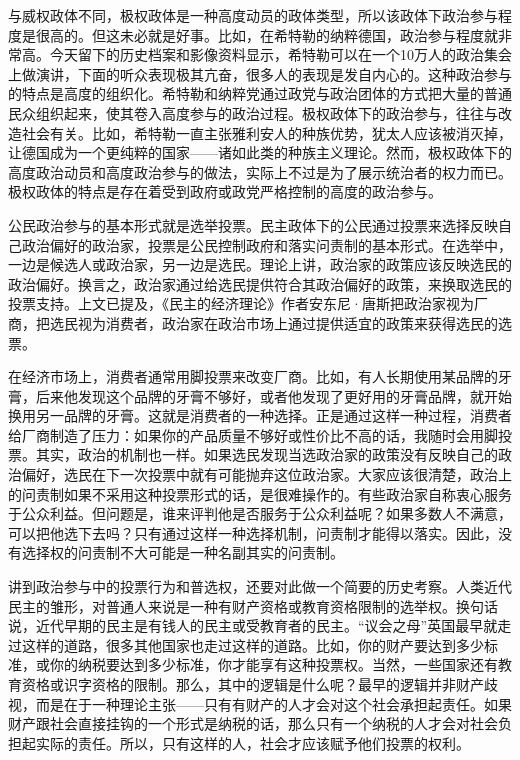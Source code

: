 与威权政体不同，极权政体是一种高度动员的政体类型，所以该政体下政治参与程度是很高的。但这未必就是好事。比如，在希特勒的纳粹德国，政治参与程度就非常高。今天留下的历史档案和影像资料显示，希特勒可以在一个10万人的政治集会上做演讲，下面的听众表现极其亢奋，很多人的表现是发自内心的。这种政治参与的特点是高度的组织化。希特勒和纳粹党通过政党与政治团体的方式把大量的普通民众组织起来，使其卷入高度参与的政治过程。极权政体下的政治参与，往往与改造社会有关。比如，希特勒一直主张雅利安人的种族优势，犹太人应该被消灭掉，让德国成为一个更纯粹的国家——诸如此类的种族主义理论。然而，极权政体下的高度政治动员和高度政治参与的做法，实际上不过是为了展示统治者的权力而已。极权政体的特点是存在着受到政府或政党严格控制的高度的政治参与。


公民政治参与的基本形式就是选举投票。民主政体下的公民通过投票来选择反映自己政治偏好的政治家，投票是公民控制政府和落实问责制的基本形式。在选举中，一边是候选人或政治家，另一边是选民。理论上讲，政治家的政策应该反映选民的政治偏好。换言之，政治家通过给选民提供符合其政治偏好的政策，来换取选民的投票支持。上文已提及，《民主的经济理论》作者安东尼·唐斯把政治家视为厂商，把选民视为消费者，政治家在政治市场上通过提供适宜的政策来获得选民的选票。

在经济市场上，消费者通常用脚投票来改变厂商。比如，有人长期使用某品牌的牙膏，后来他发现这个品牌的牙膏不够好，或者他发现了更好用的牙膏品牌，就开始换用另一品牌的牙膏。这就是消费者的一种选择。正是通过这样一种过程，消费者给厂商制造了压力：如果你的产品质量不够好或性价比不高的话，我随时会用脚投票。其实，政治的机制也一样。如果选民发现当选政治家的政策没有反映自己的政治偏好，选民在下一次投票中就有可能抛弃这位政治家。大家应该很清楚，政治上的问责制如果不采用这种投票形式的话，是很难操作的。有些政治家自称衷心服务于公众利益。但问题是，谁来评判他是否服务于公众利益呢？如果多数人不满意，可以把他选下去吗？只有通过这样一种选择机制，问责制才能得以落实。因此，没有选择权的问责制不大可能是一种名副其实的问责制。

讲到政治参与中的投票行为和普选权，还要对此做一个简要的历史考察。人类近代民主的雏形，对普通人来说是一种有财产资格或教育资格限制的选举权。换句话说，近代早期的民主是有钱人的民主或受教育者的民主。“议会之母”英国最早就走过这样的道路，很多其他国家也走过这样的道路。比如，你的财产要达到多少标准，或你的纳税要达到多少标准，你才能享有这种投票权。当然，一些国家还有教育资格或识字资格的限制。那么，其中的逻辑是什么呢？最早的逻辑并非财产歧视，而是在于一种理论主张——只有有财产的人才会对这个社会承担起责任。如果财产跟社会直接挂钩的一个形式是纳税的话，那么只有一个纳税的人才会对社会负担起实际的责任。所以，只有这样的人，社会才应该赋予他们投票的权利。


